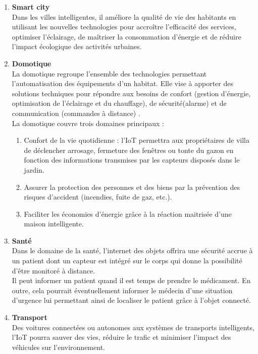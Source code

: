 	\begin{enumerate}
		\item \textbf{Smart city}\\
Dans les villes intelligentes, il améliore la qualité de vie des habitants en utilisant les nouvelles technologies pour accroître l’ef{\kern0pt}f{\kern0pt}icacité des services, optimiser l’éclairage, de maîtriser la consommation d’énergie et de réduire l’impact écologique des activités urbaines.
		\item \textbf{Domotique}\\
		La domotique regroupe l’ensemble des technologies permettant l’automatisation des équipements d’un habitat. Elle vise à apporter des solutions techniques pour répondre aux besoins de confort (gestion d’énergie, optimisation de l’éclairage et du chauf{\kern0pt}fage), de sécurité(alarme) et de communication (commandes à distance) \cite{locqueneux2015domotique}.\\
		La domotique couvre trois domaines principaux :
		\begin{enumerate}
			\item Confort de la vie quotidienne : l’IoT permettra aux propriétaires de villa de déclencher arrosage, fermeture des fenêtres ou tonte du gazon en fonction des informations transmises par les capteurs disposés dans le jardin.
			\item Assurer la protection des personnes et des biens par la prévention des risques d’accident (incendies, fuite de gaz, etc.).
			\item Faciliter les économies d’énergie grâce à la réaction maitrisée d’une maison intelligente.
		\end{enumerate}

		\item \textbf{Santé}\\
		Dans le domaine de la santé, l’internet des objets of{\kern0pt}frira une sécurité accrue à un patient dont un capteur est intégré sur le corps qui donne la possibilité d’être monitoré à distance.\\
Il peut informer un patient quand il est temps de prendre le médicament. En outre, cela pourrait éventuellement informer le médecin d’une situation d’urgence lui permettant ainsi de localiser le patient grâce à l’objet connecté.\\

		\item \textbf{Transport}\\
		Des voitures connectées ou autonomes aux systèmes de transports intelligents, l’IoT pourra sauver des vies, réduire le traf{\kern0pt}ic et minimiser l’impact des véhicules sur l’environnement.
		

\end{enumerate}

